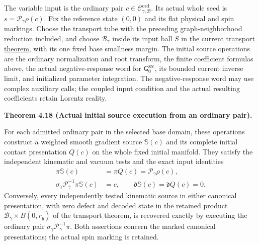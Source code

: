 \documentclass[
  english,
  11pt,
  reqno]{amsart}
\makeatletter
\newcommand{\pandocstatementheading}[1]{%
  \par\if@nobreak\else
    \addpenalty{\@beginparpenalty}%
    \addvspace{.5\baselineskip plus .2\baselineskip minus .2\baselineskip}%
  \fi
  {\normalfont\bfseries #1\par}%
  \nobreak\@afterindenttrue\@afterheading
}
\makeatother
\begin{document}
The variable input is the ordinary pair
\(c\in\mathscr C^{\mathrm{ord}}_{\gamma,\mathcal B}\). Its actual whole
seed is \(s=\mathscr P_\gamma\rho(c)\). Fix the reference state
\((0,0)\) and its flat physical and spin markings. Choose the transport
tube with the preceding graph-neighborhood reduction included, and
choose \(\mathcal B_\gamma\) inside its input ball \(S\) in
\hyperref[thm:online-current-input-transport]{the current transport
theorem}, with its one fixed base smallness margin. The initial source
operations are the ordinary normalization and root transform, the finite
coefficient formulas above, the actual negative-response word for
\(\mathsf G_0^{\mathrm{src}}\), its bounded current inverse limit, and
initialized parameter integration. The negative-response word may use
complex auxiliary calls; the coupled input condition and the actual
resulting coefficients retain Lorentz reality.

\pandocstatementheading{\leavevmode{}\label{thm:online-ordinary-negative-response-initial-source}Theorem 4.18 (Actual initial source execution from an ordinary pair).}

For each admitted ordinary pair in the selected base domain, these
operations construct a weighted smooth gradient source \(\mathbb S(c)\)
and its complete initial contact presentation \(Q(c)\) on the whole
fixed initial manifold. They satisfy the independent kinematic and
vacuum tests and the exact input identities%
 \[
\begin{aligned}
\pi\mathbb S(c)&=\pi Q(c)=\mathscr P_\gamma\rho(c),\\
\sigma_\gamma\mathscr P_\gamma^{-1}\pi\mathbb S(c)&=c,
\qquad\mathfrak d\mathbb S(c)=\mathfrak d Q(c)=0.
\end{aligned}
\] Conversely, every independently tested kinematic source in either
canonical presentation, with zero defect and decoded state in the
retained product \(\mathcal B_\gamma\times B(0,r_y)\) of the transport
theorem, is recovered exactly by executing the ordinary pair
\(\sigma_\gamma\mathscr P_\gamma^{-1}\pi\). Both assertions concern the
marked canonical presentations; the actual spin marking is retained.
\end{document}
